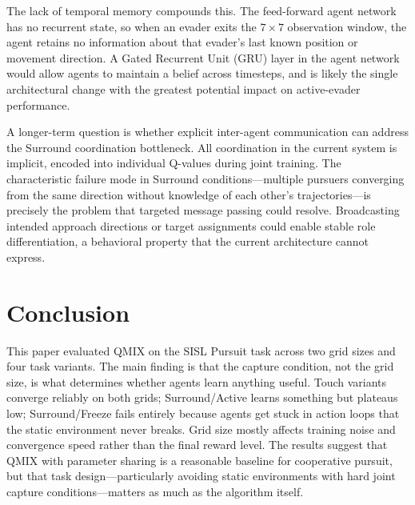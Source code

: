 \documentclass[sigconf,screen]{acmart}
\begin{document}
The lack of temporal memory compounds this. The feed-forward agent network has no recurrent state, so when an evader exits the $7{\times}7$ observation window, the agent retains no information about that evader's last known position or movement direction. A Gated Recurrent Unit (GRU) layer in the agent network would allow agents to maintain a belief across timesteps, and is likely the single architectural change with the greatest potential impact on active-evader performance.

A longer-term question is whether explicit inter-agent communication can address the Surround coordination bottleneck. All coordination in the current system is implicit, encoded into individual Q-values during joint training. The characteristic failure mode in Surround conditions---multiple pursuers converging from the same direction without knowledge of each other's trajectories---is precisely the problem that targeted message passing could resolve. Broadcasting intended approach directions or target assignments could enable stable role differentiation, a behavioral property that the current architecture cannot express.

\section{Conclusion}

This paper evaluated QMIX on the SISL Pursuit task across two grid sizes and four task variants. The main finding is that the capture condition, not the grid size, is what determines whether agents learn anything useful. Touch variants converge reliably on both grids; Surround/Active learns something but plateaus low; Surround/Freeze fails entirely because agents get stuck in action loops that the static environment never breaks. Grid size mostly affects training noise and convergence speed rather than the final reward level. The results suggest that QMIX with parameter sharing is a reasonable baseline for cooperative pursuit, but that task design---particularly avoiding static environments with hard joint capture conditions---matters as much as the algorithm itself.



\end{document}
